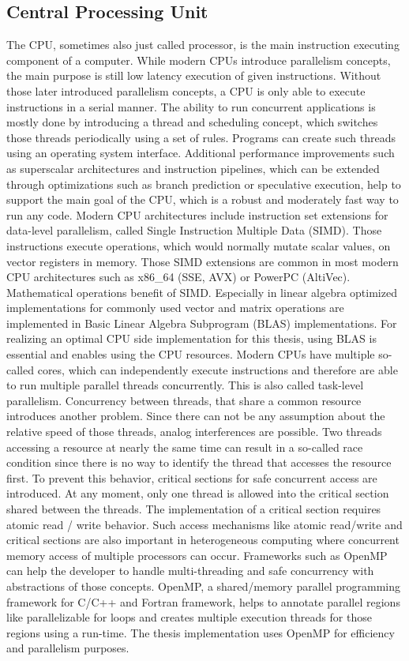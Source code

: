 \subsection{Central Processing Unit}
The CPU, sometimes also just called processor, is the main instruction executing component of a computer. While modern CPUs introduce parallelism concepts, the main purpose is still low latency execution of given instructions.
Without those later introduced parallelism concepts, a CPU is only able to execute instructions in a serial manner. The ability to run concurrent applications is mostly done by introducing a thread and scheduling concept, which switches those threads periodically using a set of rules. Programs can create such threads using an operating system interface.
Additional performance improvements such as superscalar architectures and instruction pipelines, which can be extended through optimizations such as branch prediction or speculative execution, help to support the main goal of the CPU, which is a robust and moderately fast way to run any code.
Modern CPU architectures include instruction set extensions for data-level parallelism, called Single Instruction Multiple Data (SIMD). Those instructions execute operations, which would normally mutate scalar values, on vector registers in memory. Those SIMD extensions are common in most modern CPU architectures such as x86\_64 (SSE, AVX) or PowerPC (AltiVec). Mathematical operations benefit of SIMD. Especially in linear algebra optimized implementations for commonly used vector and matrix operations are implemented in Basic Linear Algebra Subprogram (BLAS) implementations. For realizing an optimal CPU side implementation for this thesis, using BLAS is essential and enables using the CPU resources.
Modern CPUs have multiple so-called cores, which can independently execute instructions and therefore are able to run multiple parallel threads concurrently. This is also called task-level parallelism.
Concurrency between threads, that share a common resource introduces another problem. Since there can not be any assumption about the relative speed of those threads, analog interferences are possible. Two threads accessing a resource at nearly the same time can result in a so-called race condition since there is no way to identify the thread that accesses the resource first. To prevent this behavior, critical sections for safe concurrent access are introduced. At any moment, only one thread is allowed into the critical section shared between the threads. The implementation of a critical section requires atomic read / write behavior.
Such access mechanisms like atomic read/write and critical sections are also important in heterogeneous computing where concurrent memory access of multiple processors can occur.
Frameworks such as OpenMP can help the developer to handle multi-threading and safe concurrency with abstractions of those concepts. OpenMP, a shared/memory parallel programming framework for C/C++ and Fortran framework, helps to annotate parallel regions like parallelizable for loops and creates multiple execution threads for those regions using a run-time.
The thesis implementation uses OpenMP for efficiency and parallelism purposes.

